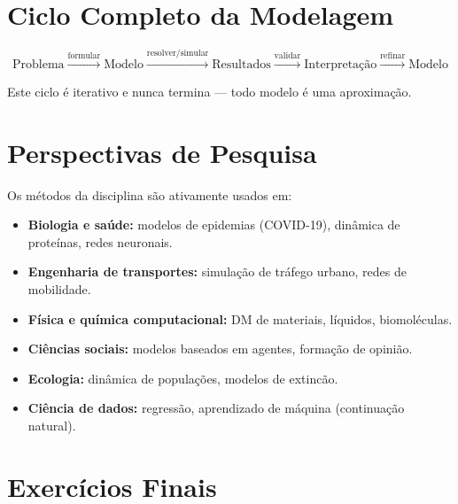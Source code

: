 \documentclass[12pt,a4paper]{article}
\begin{document}
\section*{Ciclo Completo da Modelagem}

\[
\text{Problema} \xrightarrow{\text{formular}} \text{Modelo} \xrightarrow{\text{resolver/simular}} \text{Resultados} \xrightarrow{\text{validar}} \text{Interpreta\c{c}\~ao} \xrightarrow{\text{refinar}} \text{Modelo}
\]

Este ciclo \'e iterativo e nunca termina --- todo modelo \'e uma aproxima\c{c}\~ao.

\section*{Perspectivas de Pesquisa}

Os m\'etodos da disciplina s\~ao ativamente usados em:
\begin{itemize}
  \item \textbf{Biologia e sa\'ude:} modelos de epidemias (COVID-19), din\^amica de prote\'inas, redes neuronais.
  \item \textbf{Engenharia de transportes:} simula\c{c}\~ao de tr\'afego urbano, redes de mobilidade.
  \item \textbf{F\'isica e qu\'imica computacional:} DM de materiais, l\'iquidos, biomoléculas.
  \item \textbf{Ci\^encias sociais:} modelos baseados em agentes, forma\c{c}\~ao de opini\~ao.
  \item \textbf{Ecologia:} din\^amica de popula\c{c}\~oes, modelos de extinc\~ao.
  \item \textbf{Ci\^encia de dados:} regressão, aprendizado de m\'aquina (continua\c{c}\~ao natural).
\end{itemize}

\section*{Exerc\'icios Finais}
\end{document}

